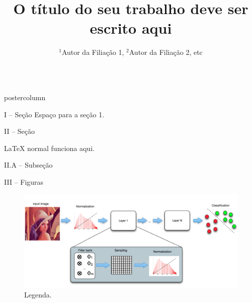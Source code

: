 \documentclass[final,hyperref={pdfpagelabels=false}]{beamer}
\title{\Huge O título do seu trabalho deve ser escrito aqui}
\author{\Large $^1$Autor da Filiação 1, $^2$Autor da Filiação 2, etc}
\institute[UNESP, ETC]{$^1$Universidade Estadual Paulista - Brasil, $^2$Filiação 2 - Brasil}
\newlength{\columnheight}
\begin{document}
\begin{frame}
	\begin{columns}
		\begin{column}{.45\textwidth}
			\begin{beamercolorbox}[center,wd=\textwidth]{postercolumn}
				\begin{minipage}[T]{.95\textwidth}  %
					\parbox[t][\columnheight]{\textwidth}{ %
						
						\begin{block}
							{\vspace{-6pt} \large I -- Seção}
							Espaço para a seção 1.          
						\end{block}
						\vspace*{14pt}
						
						\begin{block}{\vspace{-6pt} \large II -- Seção}
							\begin{itemize}
								
								{\small \item LaTeX normal funciona aqui.}
								
								
							\end{itemize}
						\end{block}
						
						\vspace*{14pt}
						
						\begin{block}{\vspace{-6pt} \large II.A -- Subseção}
						\end{block}
						
						\begin{block}{\vspace{-6pt} \large III -- Figuras}
							
							\begin{figure}[h]
								\centering
								\includegraphics[scale=1.00]{figures/deep.pdf}
								\caption{\small Legenda.}
								\label{f.deep_architecture}
							\end{figure}
							

\end{block}}
\end{minipage}
\end{beamercolorbox}
\end{column}
\end{columns}
\end{frame}
\end{document}
